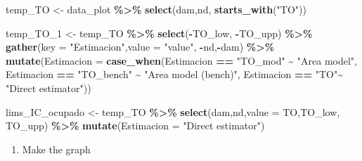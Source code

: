 \documentclass[
  12pt,
]{book}
\newenvironment{Shaded}{\begin{snugshade}}{\end{snugshade}}
\newcommand{\AttributeTok}[1]{\textcolor[rgb]{0.13,0.29,0.53}{#1}}
\newcommand{\FunctionTok}[1]{\textcolor[rgb]{0.13,0.29,0.53}{\textbf{#1}}}
\newcommand{\NormalTok}[1]{#1}
\newcommand{\OtherTok}[1]{\textcolor[rgb]{0.56,0.35,0.01}{#1}}
\newcommand{\SpecialCharTok}[1]{\textcolor[rgb]{0.81,0.36,0.00}{\textbf{#1}}}
\newcommand{\StringTok}[1]{\textcolor[rgb]{0.31,0.60,0.02}{#1}}
\providecommand{\tightlist}{%
  \setlength{\itemsep}{0pt}\setlength{\parskip}{0pt}}
\begin{document}
\begin{Shaded}
\begin{Highlighting}[]
\NormalTok{temp\_TO }\OtherTok{\textless{}{-}}\NormalTok{ data\_plot }\SpecialCharTok{\%\textgreater{}\%} \FunctionTok{select}\NormalTok{(dam,nd, }\FunctionTok{starts\_with}\NormalTok{(}\StringTok{"TO"}\NormalTok{))}


\NormalTok{temp\_TO\_1 }\OtherTok{\textless{}{-}}\NormalTok{ temp\_TO }\SpecialCharTok{\%\textgreater{}\%} \FunctionTok{select}\NormalTok{(}\SpecialCharTok{{-}}\NormalTok{TO\_low, }\SpecialCharTok{{-}}\NormalTok{TO\_upp) }\SpecialCharTok{\%\textgreater{}\%}
  \FunctionTok{gather}\NormalTok{(}\AttributeTok{key =} \StringTok{"Estimacion"}\NormalTok{,}\AttributeTok{value =} \StringTok{"value"}\NormalTok{, }\SpecialCharTok{{-}}\NormalTok{nd,}\SpecialCharTok{{-}}\NormalTok{dam) }\SpecialCharTok{\%\textgreater{}\%} 
  \FunctionTok{mutate}\NormalTok{(}\AttributeTok{Estimacion =} \FunctionTok{case\_when}\NormalTok{(Estimacion }\SpecialCharTok{==} \StringTok{"TO\_mod"} \SpecialCharTok{\textasciitilde{}} \StringTok{"Area model"}\NormalTok{,}
\NormalTok{                                Estimacion }\SpecialCharTok{==} \StringTok{"TO\_bench"} \SpecialCharTok{\textasciitilde{}} \StringTok{"Area model (bench)"}\NormalTok{,}
\NormalTok{                                Estimacion }\SpecialCharTok{==} \StringTok{"TO"}\SpecialCharTok{\textasciitilde{}} \StringTok{"Direct estimator"}\NormalTok{))}

\NormalTok{lims\_IC\_ocupado }\OtherTok{\textless{}{-}}\NormalTok{  temp\_TO }\SpecialCharTok{\%\textgreater{}\%}
  \FunctionTok{select}\NormalTok{(dam,nd,}\AttributeTok{value =}\NormalTok{ TO,TO\_low, TO\_upp) }\SpecialCharTok{\%\textgreater{}\%} 
  \FunctionTok{mutate}\NormalTok{(}\AttributeTok{Estimacion =} \StringTok{"Direct estimator"}\NormalTok{)}
\end{Highlighting}
\end{Shaded}

\begin{enumerate}
\def\labelenumi{\arabic{enumi}.}
\setcounter{enumi}{3}
\tightlist
\item
  Make the graph
\end{enumerate}
\end{document}
